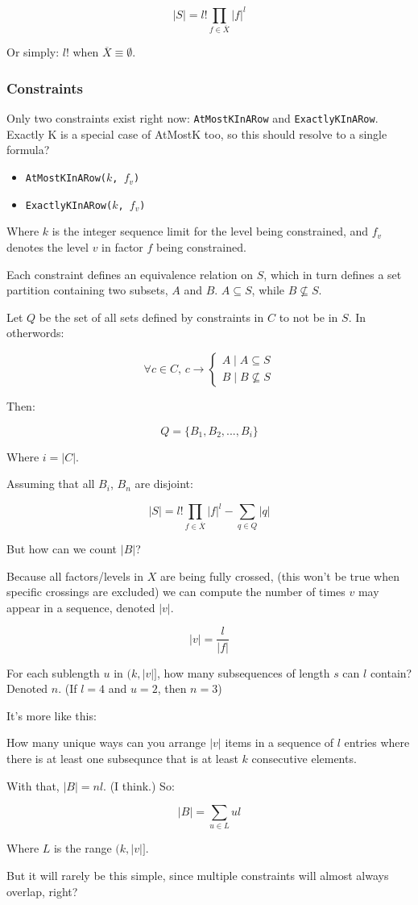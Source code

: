 \documentclass[a4paper]{article}
\begin{document}
\[
    |S|= {l!}  {\prod_{f \in \overline{X}} {|f|}^l}
\]

Or simply: $l!$ when $\overline{X} \equiv \emptyset$.

\subsubsection{Constraints}

Only two constraints exist right now: \texttt{AtMostKInARow} and \texttt{ExactlyKInARow}. Exactly K is a special case of AtMostK too, so this should resolve to a single formula?

\begin{itemize}
\item \texttt{AtMostKInARow($k$, $f_v$)}
\item \texttt{ExactlyKInARow($k$, $f_v$)}
\end{itemize}

Where $k$ is the integer sequence limit for the level being constrained, and $f_v$ denotes the level $v$ in factor $f$ being constrained.

Each constraint defines an equivalence relation on $S$, which in turn defines a set partition containing two subsets, $A$ and $B$. $A \subseteq S$, while $B \not\subseteq S$.

Let $Q$ be the set of all sets defined by constraints in $C$ to not be in $S$. In otherwords:

\[
    \forall c \in C \text{, } c \to \begin{cases}
      A \mid A \subseteq S\\
      B \mid B \not\subseteq S
    \end{cases}
\]


Then:

\[
    Q = \{{ B_1, B_2, ..., B_i\}}
\]

Where $i = |C|$.

Assuming that all $B_i$, $B_n$ are disjoint:

\[
    |S| = {l!} {\prod_{f \in \overline{X}} {|f|}^l} - \sum_{q \in Q} {|q|}
\]

But how can we count $|B|$?

Because all factors/levels in $X$ are being fully crossed, (this won't be true when specific crossings are excluded) we can compute the number of times $v$ may appear in a sequence, denoted $|v|$.

\[
    |v| = \frac{l}{|f|}
\]

For each sublength $u$ in $(k, |v|]$, how many subsequences of length $s$ can $l$ contain? Denoted $n$. (If $l = 4$ and $u = 2$, then $n = 3$)

It's more like this:

How many unique ways can you arrange $|v|$ items in a sequence of $l$ entries where there is at least one subsequnce that is at least $k$ consecutive elements.

With that, $|B| = nl$. (I think.) So:

\[
    |B| = \sum_{u \in L} ul
\]

Where $L$ is the range $(k, |v|]$.

But it will rarely be this simple, since multiple constraints will almost always overlap, right?
\end{document}
